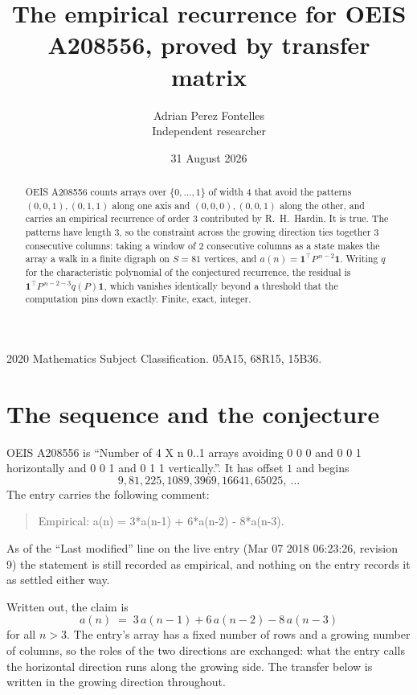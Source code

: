 \documentclass[11pt,a4paper]{article}
\title{The empirical recurrence for OEIS A208556, proved by transfer matrix}
\author{Adrian Perez Fontelles\\ \small Independent researcher}
\date{31 August 2026}
\theoremstyle{plain}
\theoremstyle{definition}
\begin{document}
\maketitle

\begin{abstract}
OEIS A208556 counts arrays over $\{0,\dots,1\}$ of width $4$ that avoid the patterns
$(0,0,1), (0,1,1)$ along one axis and $(0,0,0), (0,0,1)$ along the other, and carries an empirical recurrence of
order $3$ contributed by R.~H.~Hardin. It is true. The patterns have length $3$, so
the constraint across the growing direction ties together $3$ consecutive columns: taking a
window of $2$ consecutive columns as a state makes the array a walk in a finite digraph
on $S=81$ vertices, and $a(n)=\mathbf{1}^{\!\top}P^{\,n-2}\mathbf{1}$. Writing $q$
for the characteristic polynomial of the conjectured recurrence, the residual is
$\mathbf{1}^{\!\top}P^{\,n-2-3}q(P)\mathbf{1}$, which vanishes identically
beyond a threshold that the computation pins down exactly. Finite, exact, integer.
\end{abstract}

\noindent\small 2020 Mathematics Subject Classification. 05A15, 68R15, 15B36.\normalsize

\section{The sequence and the conjecture}

OEIS A208556 is ``Number of 4 X n 0..1 arrays avoiding 0 0 0 and 0 0 1 horizontally and 0 0 1 and 0 1 1 vertically.''. It has offset
$1$ and begins
\[
9, 81, 225, 1089, 3969, 16641, 65025,\ \dots
\]
The entry carries the following comment:
\begin{quote}\small
Empirical: a(n) = 3*a(n-1) + 6*a(n-2) - 8*a(n-3).
\end{quote}
As of the ``Last modified'' line on the live entry (Mar 07 2018 06:23:26, revision
9) the statement is still recorded as empirical, and nothing on the entry
records it as settled either way.

Written out, the claim is
\begin{equation}\label{eq:conj}
a(n)\;=\;3\,a(n-1) + 6\,a(n-2) - 8\,a(n-3)
\end{equation}
for all $n>3$. The entry's array has a fixed number of rows and a growing number of
columns, so the roles of the two directions are exchanged: what the entry calls the
horizontal direction runs along the growing side. The transfer below is written in the
growing direction throughout.
\end{document}
